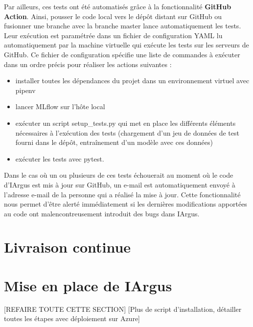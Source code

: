 \documentclass[french]{article}
\begin{document}
    Par ailleurs, ces tests ont été automatisés grâce à la fonctionnalité \textbf{GitHub Action}. Ainsi, pousser le code local vers le dépôt distant sur GitHub ou fusionner une branche avec la branche master lance automatiquement les tests. Leur exécution est paramétrée dans un fichier de configuration YAML lu automatiquement par la machine virtuelle qui exécute les tests sur les serveurs de GitHub. Ce fichier de configuration spécifie une liste de commandes à exécuter dans un ordre précis pour réaliser les actions suivantes :
    \begin{itemize}
        \item installer toutes les dépendances du projet dans un environnement virtuel avec pipenv
        \item lancer MLflow sur l'hôte local
        \item exécuter un script setup\_tests.py qui met en place les différents éléments nécessaires à l'exécution des tests (chargement d'un jeu de données de test fourni dans le dépôt, entraînement d'un modèle avec ces données)
        \item exécuter les tests avec pytest.
    \end{itemize}

    Dans le cas où un ou plusieurs de ces tests échouerait au moment où le code d'IArgus est mis à jour sur GitHub, un e-mail est automatiquement envoyé à l'adresse e-mail de la personne qui a réalisé la mise à jour. Cette fonctionnalité nous permet d'être alerté immédiatement si les dernières modifications apportées au code ont malencontreusement introduit des bugs dans IArgus.


    \section{Livraison continue}
    
    

    \section{Mise en place de IArgus} \label{mise_en_place}

    [REFAIRE TOUTE CETTE SECTION]
    [Plus de script d'installation, détailler toutes les étapes avec déploiement sur Azure]
\end{document}

